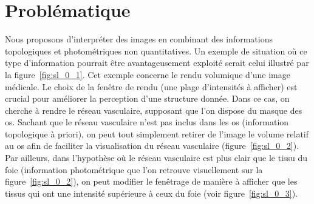 


	\section{Problématique}
	
	Nous proposons d'interpréter des images en combinant des informations topologiques \cite[Fasquel]{Fasquel2006} et photométriques non quantitatives. Un exemple de situation où ce type d'information pourrait être avantageusement exploité serait celui illustré par la figure~\ref{fig:sl_0_1}. Cet exemple concerne le rendu volumique d'une image médicale. Le choix de la fenêtre de rendu (une plage d'intensités à afficher) est crucial pour améliorer la perception d'une structure donnée. Dans ce cas, on cherche à rendre le réseau vasculaire, supposant que l'on dispose du masque des os. Sachant que le réseau vasculaire n'est pas inclus dans les os (information topologique à priori), on peut tout simplement retirer de l'image le volume relatif au os afin de faciliter la visualisation du réseau vasculaire (figure~\ref{fig:sl_0_2}). Par ailleurs, dans l'hypothèse où le réseau vasculaire est plus clair que le tissu du foie (information photométrique que l'on retrouve visuellement sur la figure~\ref{fig:sl_0_2}), on peut modifier le fenêtrage de manière à afficher que les tissus qui ont une intensité supérieure à ceux du foie (voir figure~\ref{fig:sl_0_3}).

